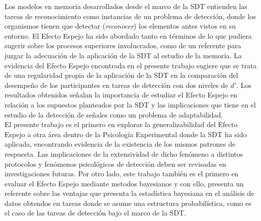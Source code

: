 Los modelos en memoria desarrollados desde el marco de la SDT entienden las tareas de reconocimiento como instancias de un problema de detección, donde los organismos tienen que detectar (\textit{reconocer}) los elementos antes vistos en su entorno. El Efecto Espejo ha sido abordado tanto en términos de lo que pudiera sugerir sobre los procesos superiores involucrados, como de un referente para juzgar la adecuación de la aplicación de la SDT al estudio de la memoria. La evidencia del Efecto Espejo encontrada en el presente trabajo sugiere que se trata de una regularidad propia de la aplicación de la SDT en la comparación del desempeño de los participantes en tareas de detección con dos niveles de $d'$. Los resultados obtenidos señalan la importancia de estudiar el Efecto Espejo en relación a los supuestos planteados por la SDT y las implicaciones que tiene en el estudio de la detección de señales como un problema de adaptabilidad.\\

El presente trabajo es el primero en explorar la generalizabilidad del Efecto Espejo a otra área dentro de la Psicología Experimental donde la SDT ha sido aplicada, encontrando evidencia de la existencia de los mismos patrones de respuesta. Las implicaciones de la extensividad de dicho fenómeno a distintos protocolos y fenómenos psicológicos de detección deben ser revisadas en investigaciones futuras. Por otro lado, este trabajo también es el primero en evaluar el Efecto Espejo mediante metodos bayesianos y con ello, presenta un referente sobre las ventajas que presenta la estadística bayesiana en el análisis de datos obtendos en tareas donde se asume una estructura probabilística, como es el caso de las tareas de detección bajo el marco de la SDT.\\









